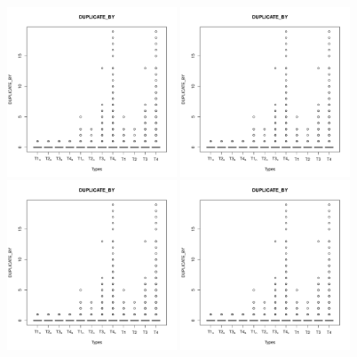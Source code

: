 \begin{figure}
\centering
\includegraphics[page=1, width=0.45\textwidth]{extract/Rplots}
\includegraphics[page=2, width=0.45\textwidth]{extract/Rplots} \\
\includegraphics[page=3, width=0.45\textwidth]{extract/Rplots}
\includegraphics[page=4, width=0.45\textwidth]{extract/Rplots} \\

\end{figure}
